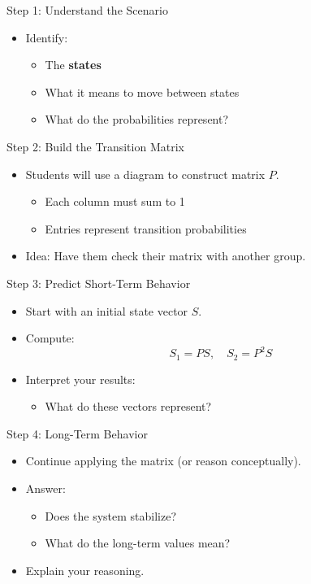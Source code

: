 \documentclass[dvipsnames]{beamer}
\begin{document}
\begin{frame}{Step 1: Understand the Scenario}
\begin{itemize}
    \item Identify:
    \begin{itemize}
        \item The \textbf{states}
        \item What it means to move between states
    \end{itemize}
    \begin{itemize}
        \item What do the probabilities represent?
    \end{itemize}
\end{itemize}
\end{frame}

\begin{frame}{Step 2: Build the Transition Matrix}
\begin{itemize}
    \item Students will use a diagram to construct matrix $P$.
    \begin{itemize}
        \item Each column must sum to 1
        \item Entries represent transition probabilities
    \end{itemize}
    \item Idea: Have them check their matrix with another group.
\end{itemize}
\end{frame}

\begin{frame}{Step 3: Predict Short-Term Behavior}
\begin{itemize}
    \item Start with an initial state vector $S$.
    \item Compute:
    \[
    S_1 = P S, \quad S_2 = P^2 S
    \]
    \item Interpret your results:
    \begin{itemize}
        \item What do these vectors represent?
    \end{itemize}
\end{itemize}
\end{frame}

\begin{frame}{Step 4: Long-Term Behavior}
\begin{itemize}
    \item Continue applying the matrix (or reason conceptually).
    \item Answer:
    \begin{itemize}
        \item Does the system stabilize?
        \item What do the long-term values mean?
    \end{itemize}
    \item Explain your reasoning.
\end{itemize}
\end{frame}
\end{document}
